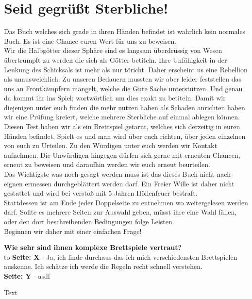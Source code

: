 \documentclass[11pt,a5paper,twoside]{book}
\begin{document}
\newpage


\section*{Seid gegrüßt Sterbliche!}



		

	


Das Buch welches sich grade in ihren Händen befindet ist wahrlich kein normales Buch. Es ist eine Chance euren Wert für uns zu beweisen.\\
Wir die Halbgötter dieser Sphäre sind es langsam überdrüssig von Wesen übertrumpft zu werden die sich als Götter betiteln. Ihre Unfähigkeit in der Lenkung des Schicksals ist mehr als nur töricht. Daher erscheint us eine Rebellion als unausweichlich. Zu unseren Bedauern mussten wir aber leider feststellen das uns an Frontkämpfern mangelt, welche die Gute Sache unterstützen. Und genau da kommt ihr ins Spiel; wortwörtlich um dies exakt zu betiteln.
Damit wir diejenigen unter euch finden die mehr nutzen haben als Schaden anrichten haben wir eine Prüfung kreiert, welche mehrere Sterbliche auf einmal ablegen können.\\
Diesen Test haben wir als ein Brettspiel getarnt, welches sich derzeitig in euren Händen befindet. Spielt es und man wird über euch richten, über jeden einzelnen von euch zu Urteilen. Zu den Würdigen unter euch werden wir Kontakt aufnehmen. Die Unwürdigen hingegen dürfen sich gerne mit erneuten Chancen, erneut zu beweisen und daraufhin werden wir euch erneut beurteilen.\\

Das Wichtigste was noch gesagt werden muss ist das dieses Buch nicht nach eignen ermessen durchgeblättert werden darf. Ein Freier Wille ist daher nicht gestattet und wird bei verstoß mit 5 Jahren Höllenfeuer bestraft.\\
Stattdessen ist am Ende jeder Doppelseite zu entnehmen wo weitergelesen werden darf. Sollte es mehrere Seiten zur Auswahl geben, müsst ihre eine Wahl fällen, oder den dort beschreibenden Bedingungen folge Leisten.\\
Beginnen wir daher mit einer einfachen Frage!
\vfill


\textbf{Wie sehr sind ihnen komplexe Brettspiele vertraut?} \\
\def\dashfill{\cleaders\hbox{-}\hfill}
\hbox to \hsize{\dashfill\hfil}
\textbf{Seite: X} - Ja, ich finde durchaus das ich mich verschiedensten Brettspielen auskenne. Ich schätze ich werde die Regeln recht schnell verstehen.\\
\textbf{Seite: Y} - asdf



\newpage


Text
\end{document}
